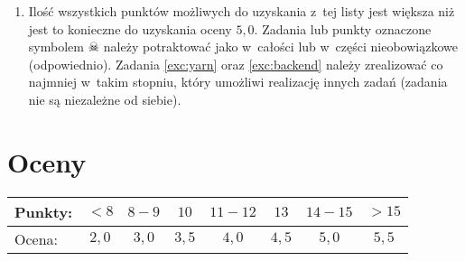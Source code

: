 \documentclass[12pt]{article}
\begin{document}
\begin{enumerate}
            \item Ilość wszystkich punktów możliwych do uzyskania z~tej listy jest większa niż jest to konieczne do uzyskania oceny $5,0$. Zadania lub punkty oznaczone symbolem $\skull$ należy potraktować jako w~całości lub w~części nieobowiązkowe (odpowiednio). Zadania \ref{exc:yarn} oraz \ref{exc:backend} należy zrealizować co najmniej w~takim stopniu, który umożliwi realizację innych zadań (zadania nie są niezależne od siebie).
        \end{enumerate}

    \section*{Oceny}
    \begin{tabular}{|l|c|c|c|c|c|c|c|}
        \hline
        Punkty: & $<8$ & $8-9$ & $10$ & $11-12$ & $13$ & $14-15$ & $>15$ \\
        \hline
        Ocena:  & $2,0$ & $3,0$ & $3,5$ & $4,0$ & $4,5$ & $5,0$ & $5,5$ \\
        \hline
    \end{tabular}
\end{document}
